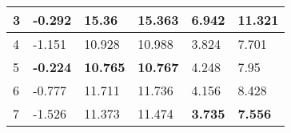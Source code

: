 \documentclass[10pt,a4paper]{article}
\begin{document}
\begin{table}[h]
\begin{tabular}{|l|l|l|l|l|l|}
3                                 & -0.292                                                                                        & 15.36                                                                                          & 15.363                                                                               & 6.942                                                                                & 11.321                                                                                           \\ \hline
4                                 & -1.151                                                                                        & 10.928                                                                                         & 10.988                                                                               & 3.824                                                                                & 7.701                                                                                            \\ \hline
5                                 & {\color[HTML]{32CB00} \textbf{-0.224}}                                                        & {\color[HTML]{32CB00} \textbf{10.765}}                                                         & {\color[HTML]{32CB00} \textbf{10.767}}                                               & 4.248                                                                                & 7.95                                                                                             \\ \hline
6                                 & -0.777                                                                                        & {\color[HTML]{333333} 11.711}                                                                  & 11.736                                                                               & 4.156                                                                                & 8.428                                                                                            \\ \hline
7                                 & -1.526                                                                                        & 11.373                                                                                         & 11.474                                                                               & {\color[HTML]{32CB00} \textbf{3.735}}                                                & {\color[HTML]{32CB00} \textbf{7.556}}                                                            \\ \hline
\end{tabular}
\end{table}
\end{document}
